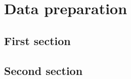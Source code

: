 \chapter{Data preparation}

\section{First section}

\lipsum[8-9]

\section{Second section}

\lipsum[10-11]

\clearpage


